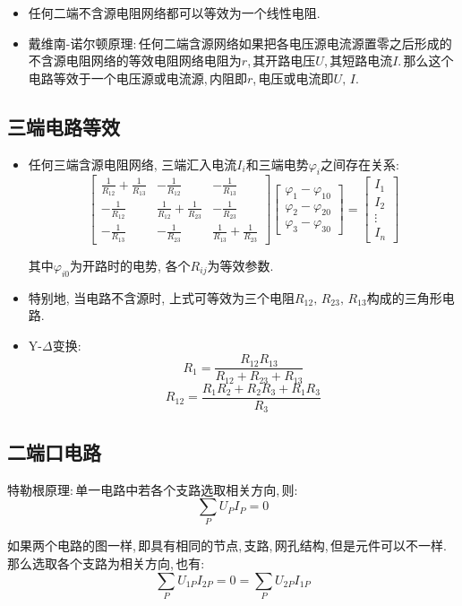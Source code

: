 \begin{itemize}

\item 任何二端不含源电阻网络都可以等效为一个线性电阻.

\item 戴维南-诺尔顿原理:\,任何二端含源网络如果把各电压源电流源置零之后形成的不含源电阻网络的等效电阻网络电阻为$r$,\,其开路电压$U$,\,其短路电流$I$.\,那么这个电路等效于一个电压源或电流源,\,内阻即$r$,\,电压或电流即$U,\,I$.

\end{itemize}

\subsection{三端电路等效}

\begin{itemize}
\item 任何三端含源电阻网络, 三端汇入电流$I_i$和三端电势$\varphi_{i}$之间存在关系:
\[\begin{bmatrix}
\frac{1}{R_{12}}+\frac{1}{R_{13}}  & -\frac{1}{R_{12}} &-\frac{1}{R_{13}} \\ 
-\frac{1}{R_{12}}  &\frac{1}{R_{12}}+\frac{1}{R_{23}}  &-\frac{1}{R_{23}}\\
-\frac{1}{R_{13}}  & -\frac{1}{R_{23}} &\frac{1}{R_{13}}+\frac{1}{R_{23}}
 \end{bmatrix}\begin{bmatrix}
\varphi_1-\varphi_{10} \\ 
\varphi_2-\varphi_{20}\\
\varphi_3-\varphi_{30}
  \end{bmatrix}=\begin{bmatrix}
I_1 \\ 
I_2\\
\vdots\\
I_n
  \end{bmatrix}\]

其中$\varphi_{i0}$为开路时的电势, 各个$R_{ij}$为等效参数.

\item 特别地, 当电路不含源时, 上式可等效为三个电阻$R_{12},\,R_{23},\,R_{13}$构成的三角形电路.

\item Y-$\Delta$变换:
\[R_1=\frac{R_{12}R_{13}}{R_{12}+R_{23}+R_{13}}\]
\[R_{12}=\frac{R_1R_2+R_2R_3+R_1R_3}{R_3}\]

\end{itemize}


\subsection{二端口电路}

特勒根原理:\,单一电路中若各个支路选取相关方向,\,则:
\[\sum_P U_PI_P=0\]

如果两个电路的图一样,\,即具有相同的节点,\,支路,\,网孔结构,\,但是元件可以不一样.\,那么选取各个支路为相关方向,\,也有:
\[\sum_P U_{1P}I_{2P}=0=\sum_P U_{2P}I_{1P}\]


